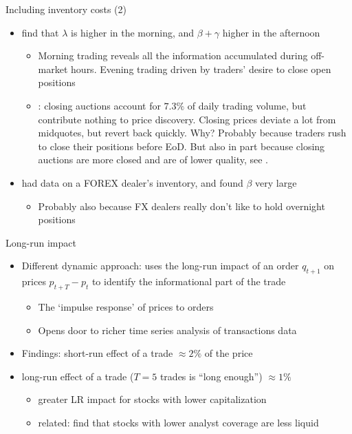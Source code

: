 \documentclass[english,10pt
,aspectratio=169
]{beamer}
\begin{document}
\begin{frame}{Including inventory costs (2)}
	\begin{itemize}
		\item \textbf{\citet*{madhavan_why_1997}} find that $\lambda$ is higher in the morning, and $\beta+\gamma$ higher in the afternoon
		\begin{itemize}
			\item Morning trading reveals all the information accumulated during off-market hours. Evening trading driven by traders' desire to close open positions
			\item \textbf{\cite{bogousslavsky_should_2020}}: closing auctions account for $7.3\%$ of daily trading volume, but contribute nothing to price discovery. Closing prices deviate a lot from midquotes, but revert back quickly. Why? 
			\pause 
			Probably because traders rush to close their positions before EoD. But also in part because closing auctions are more closed and are of lower quality, see \textbf{\cite{hu_vestigial_2020}}.
		\end{itemize}
		\item \textbf{\cite{lyons_tests_1995}} had data on a FOREX dealer's inventory, and found $\beta$ very large
		\begin{itemize}
			\item Probably also because FX dealers really don't like to hold overnight positions
		\end{itemize}
	\end{itemize}
\end{frame}


\begin{frame}{Long-run impact}
	\begin{itemize}
		\item Different dynamic approach: \textbf{\cite{hasbrouck_measuring_1991}} uses the long-run impact of an order $q_{t+1}$ on prices $p_{t+T}-p_t$ to identify the informational part of the trade
		\begin{itemize}
			\item The `impulse response' of prices to orders
			\item Opens door to richer time series analysis of transactions data
		\end{itemize}
		\item Findings: short-run effect of a trade $\approx 2\%$ of the price
		\item long-run effect of a trade ($T=5$ trades is ``long enough'') $\approx 1\%$
		\begin{itemize}
			\item greater LR impact for stocks with lower capitalization
			\item related: \textbf{\cite{ellul_financial_2018}} find that stocks with lower analyst coverage are less liquid
		\end{itemize}
	\end{itemize}
\end{frame}
\end{document}
